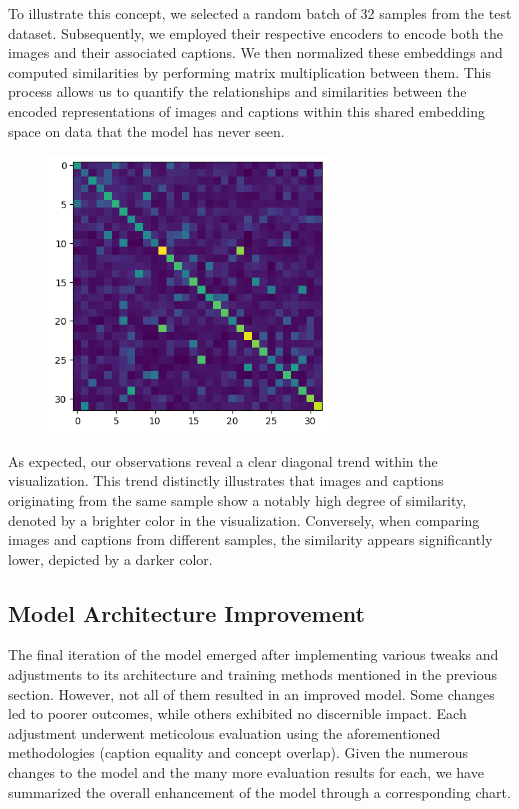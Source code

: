 \documentclass[12pt, a4paper]{article}
\begin{document}
To illustrate this concept, we selected a random batch of 32 samples from the test dataset. Subsequently, we employed their respective encoders to encode both the images and their associated captions. We then normalized these embeddings and computed similarities by performing matrix multiplication between them. This process allows us to quantify the relationships and similarities between the encoded representations of images and captions within this shared embedding space on data that the model has never seen.

\begin{figure}[h!]
    \includegraphics[width=20em]{img/Diagonal.png}
    \centering
\end{figure}

As expected, our observations reveal a clear diagonal trend within the visualization. This trend distinctly illustrates that images and captions originating from the same sample show a notably high degree of similarity, denoted by a brighter color in the visualization. Conversely, when comparing images and captions from different samples, the similarity appears significantly lower, depicted by a darker color.

\subsection{Model Architecture Improvement}

The final iteration of the model emerged after implementing various tweaks and adjustments to its architecture and training methods mentioned in the previous section. However, not all of them resulted in an improved model. Some changes led to poorer outcomes, while others exhibited no discernible impact. Each adjustment underwent meticolous evaluation using the aforementioned methodologies (caption equality and concept overlap). Given the numerous changes to the model and the many more evaluation results for each, we have summarized the overall enhancement of the model through a corresponding chart.
\end{document}
